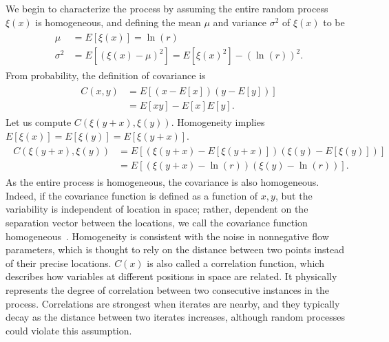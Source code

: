 We begin to characterize the process by
assuming the entire random process $\xi(x)$ is homogeneous, and defining the mean $\mu$ and variance $\sigma^2$
of $\xi(x)$ to be
\begin{align}
\begin{split}\label{ximean}
\mu &= E[\xi(x)] = \ln(r)\\
\sigma^2 &= E[(\xi(x) - \mu)^2]=E[\xi(x)^2]-(\ln(r))^2.
\end{split}
\end{align}
From probability, the definition of covariance is~\cite{ross}
\begin{align*}
\begin{split}
C(x,y) &= E[(x - E[x])(y - E[y])]\\
&= E[xy] - E[x]E[y].
\end{split}
\end{align*}
Let us compute $C(\xi(y+x),\xi(y))$. Homogeneity implies $E[\xi(x)] =
E[\xi(y)] = E[\xi(y+x)]$.
\begin{align}
\begin{split}\label{cor}
C(\xi(y+x),\xi(y)) &= E[(\xi(y+x) - E[\xi(y+x)])(\xi(y) -
E[\xi(y)])]\\
&= E[(\xi(y+x) -\ln(r))(\xi(y)-\ln(r))]. 
\end{split}
\end{align}
As the entire process is homogeneous, the covariance is also
homogeneous. Indeed, if the covariance function is defined as a function of $x,y$, but the
variability is independent of location in space; rather, dependent on
the separation vector between the locations, we call the covariance
function homogeneous~\cite{gelhar}. Homogeneity is consistent with the
noise in nonnegative flow parameters, which is
thought to rely on the distance between two points instead of their
precise locations. $C(x)$ is also called a correlation function, which
describes how variables at different positions in space are
related. It physically represents the degree of correlation between
two consecutive instances in the process. Correlations are strongest
when iterates are nearby, and they typically decay as the distance
between two iterates increases, although random processes could violate this assumption. 

